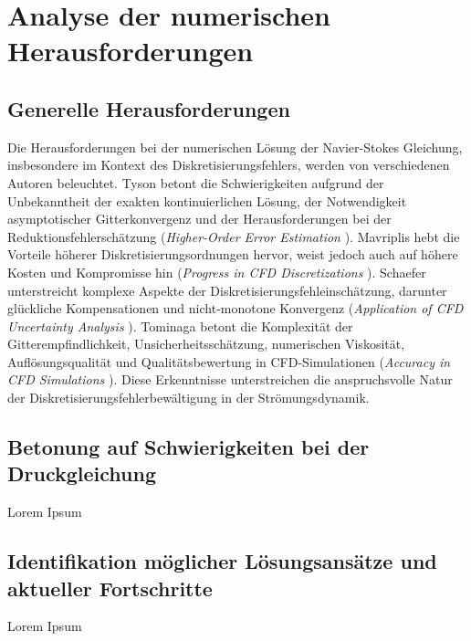 \section{Analyse der numerischen Herausforderungen}

\subsection{Generelle Herausforderungen}
Die Herausforderungen bei der numerischen Lösung der Navier-Stokes Gleichung, insbesondere im Kontext des Diskretisierungsfehlers, werden von verschiedenen Autoren beleuchtet. Tyson betont die Schwierigkeiten aufgrund der Unbekanntheit der exakten kontinuierlichen Lösung, der Notwendigkeit asymptotischer Gitterkonvergenz und der Herausforderungen bei der Reduktionsfehlerschätzung (\textit{Higher-Order Error Estimation} \parencite{tysonHigherorderErrorEstimation2019}). Mavriplis hebt die Vorteile höherer Diskretisierungsordnungen hervor, weist jedoch auch auf höhere Kosten und Kompromisse hin (\textit{Progress in CFD Discretizations} \parencite{mavriplisProgressCFDDiscretizations}). Schaefer unterstreicht komplexe Aspekte der Diskretisierungsfehleinschätzung, darunter glückliche Kompensationen und nicht-monotone Konvergenz (\textit{Application of CFD Uncertainty Analysis} \parencite{schaef}). Tominaga betont die Komplexität der Gitterempfindlichkeit, Unsicherheitsschätzung, numerischen Viskosität, Auflösungsqualität und Qualitätsbewertung in CFD-Simulationen (\textit{Accuracy in CFD Simulations} \parencite{tominagaAccuracyCFDSimulations2023}). Diese Erkenntnisse unterstreichen die anspruchsvolle Natur der Diskretisierungsfehlerbewältigung in der Strömungsdynamik.

\subsection{Betonung auf Schwierigkeiten bei der Druckgleichung}
Lorem Ipsum

\subsection{Identifikation möglicher Lösungsansätze und aktueller Fortschritte}
Lorem Ipsum